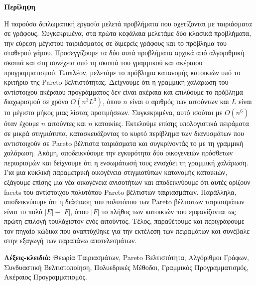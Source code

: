 \clearpage

\begin{center}
{\Large \textbf{Περίληψη}}
\end{center}

\vspace{1cm}

Η παρούσα διπλωματική εργασία μελετά προβλήματα που σχετίζονται με ταιριάσματα σε γράφους. Συγκεκριμένα, στα πρώτα κεφάλαια μελετάμε δύο κλασικά προβλήματα, την εύρεση μέγιστου ταιριάσματος σε διμερείς γράφους και το πρόβλημα του σταθερού γάμου. Προσεγγίζουμε τα δύο αυτά προβλήματα αρχικά από αλγοριθμική σκοπιά και στη συνέχεια από τη σκοπιά του γραμμικού και ακέραιου προγραμματισμού. Επιπλέον, μελετάμε το πρόβλημα κατανομής κατοικιών υπό το κριτήριο της Pareto βελτιστότητας. Δείχνουμε ότι η γραμμική χαλάρωση του αντίστοιχου ακέραιου προγράμματος δεν είναι ακέραια και επιλύουμε το πρόβλημα διαχωρισμού σε χρόνο $O(n^{3}L^{3})$, όπου $n$ είναι ο αριθμός των αιτούντων και $L$ είναι το μέγιστο μήκος μιας λίστας προτιμήσεων. Συγκεκριμένα, αυτό ισούται με $O(n^{6})$ όταν έχουμε $n$ αιτούντες και $n$ κατοικίες. Εκτελούμε επίσης υπολογιστικά πειράματα σε μικρά στιγμιότυπα, κατασκευάζοντας το κυρτό περίβλημα των διανυσμάτων που αντιστοιχούν σε Pareto βέλτιστα ταιριάσματα και συγκρίνοντάς το με τη γραμμική χαλάρωση. Ακόμη, αποδεικνύουμε την εγκυρότητα δύο οικογενειών πρόσθετων περιορισμών και δείχνουμε ότι η ενσωμάτωσή τους ενισχύει τη γραμμική χαλάρωση. Για μια κυκλική παραμετρική οικογένεια στιγμιοτύπων κατανομής κατοικιών, εξάγουμε επίσης μια νέα οικογένεια ανισοτήτων και αποδεικνύουμε ότι αυτές ορίζουν facets του αντίστοιχου πολυτόπου Pareto βέλτιστων ταιριασμάτων. Παράλληλα, αποδεικνύουμε ότι η διάσταση του πολυτόπου των Pareto βέλτιστων ταιριασμάτων είναι το πολύ $|E|-|F|$, όπου $|F|$ το πλήθος των κατοικιών που εμφανίζονται ως πρώτη επιλογή τουλάχιστον ενός αιτούντος. Τέλος, παραθέτουμε και περιγράφουμε τον πηγαίο κώδικα που αναπτύχθηκε για την εκτέλεση των πειραμάτων και συνέβαλε στην εξαγωγή των παραπάνω αποτελεσμάτων.

\vspace{2em}
\noindent
\textbf{Λέξεις-κλειδιά:} Θεωρία Ταιριασμάτων, Pareto Βελτιστότητα,
Αλγόριθμοι Γράφων, Συνδυαστική Βελτιστοποίηση, Πολυεδρικές Μέθοδοι,
Γραμμικός Προγραμματισμός, Ακέραιος Προγραμματισμός.

\clearpage